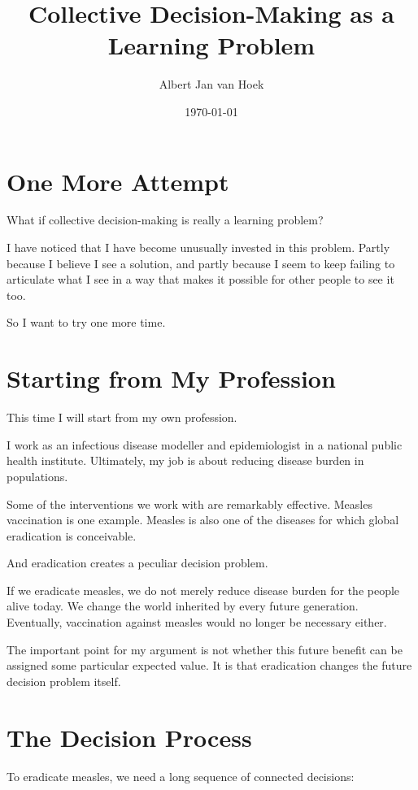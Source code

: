 \documentclass{article}
\title{Collective Decision-Making as a Learning Problem}
\author{Albert Jan van Hoek}
\date{\today}
\begin{document}
\maketitle

\section*{One More Attempt}

What if collective decision-making is really a learning problem?

I have noticed that I have become unusually invested in this problem. Partly because I believe I see a solution, and partly because I seem to keep failing to articulate what I see in a way that makes it possible for other people to see it too.

So I want to try one more time.

\section*{Starting from My Profession}

This time I will start from my own profession.

I work as an infectious disease modeller and epidemiologist in a national public health institute. Ultimately, my job is about reducing disease burden in populations.

Some of the interventions we work with are remarkably effective. Measles vaccination is one example. Measles is also one of the diseases for which global eradication is conceivable.

And eradication creates a peculiar decision problem.

If we eradicate measles, we do not merely reduce disease burden for the people alive today. We change the world inherited by every future generation. Eventually, vaccination against measles would no longer be necessary either.

The important point for my argument is not whether this future benefit can be assigned some particular expected value. It is that eradication changes the future decision problem itself.

\section*{The Decision Process}

To eradicate measles, we need a long sequence of connected decisions:
\end{document}
